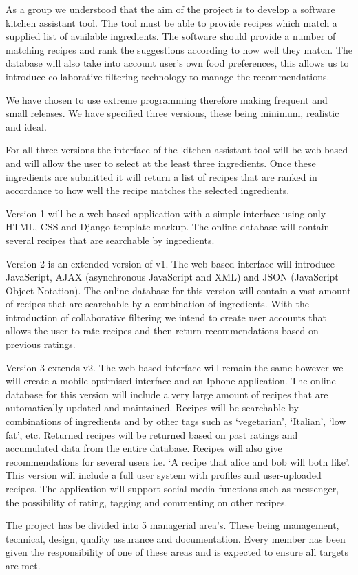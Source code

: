 As a group we understood that the aim of the project is to develop a software kitchen assistant tool. The tool must be able to provide recipes which match a supplied list of available ingredients. The software should provide a number of matching recipes and rank the suggestions according to how well they match. The database will also take into account user’s own food preferences, this allows us to introduce collaborative filtering technology to manage the recommendations. 

We have chosen to use extreme programming therefore making frequent and small releases. We have specified three versions, these being minimum, realistic and ideal. 

For all three versions the interface of the kitchen assistant tool will be web-based and will allow the user to select at the least three ingredients. Once these ingredients are submitted it will return a list of recipes that are ranked in accordance to how well the recipe matches the selected ingredients. 

Version 1 will be a web-based application with a simple interface using only HTML, CSS and Django template markup. The online database will contain several recipes that are searchable by ingredients.

Version 2 is an extended version of v1.  The web-based interface will introduce JavaScript, AJAX (asynchronous JavaScript and XML) and JSON (JavaScript Object Notation). The online database for this version will contain a vast amount of recipes that are searchable by a combination of ingredients. With the introduction of collaborative filtering we intend to create user accounts that allows the user to rate recipes and then return recommendations based on previous ratings. 

Version 3 extends v2. The web-based interface will remain the same however we will create a mobile optimised interface and an Iphone application. The online database for this version will include a very large amount of recipes that are automatically updated and maintained. Recipes will be searchable by combinations of ingredients and by other tags such as ‘vegetarian’, ‘Italian’, ‘low fat’, etc. Returned recipes will be returned based on past ratings and accumulated data from the entire database. Recipes will also give recommendations for several users i.e. ‘A recipe that alice and bob will both like’. This version will include a full user system with profiles and user-uploaded recipes. The application will support social media functions such as messenger, the possibility of rating, tagging and commenting on other recipes. 

The project has be divided into 5 managerial area’s. These being management, technical, design, quality assurance and documentation. Every member has been given the responsibility of one of these areas and is expected to ensure all targets are met.


